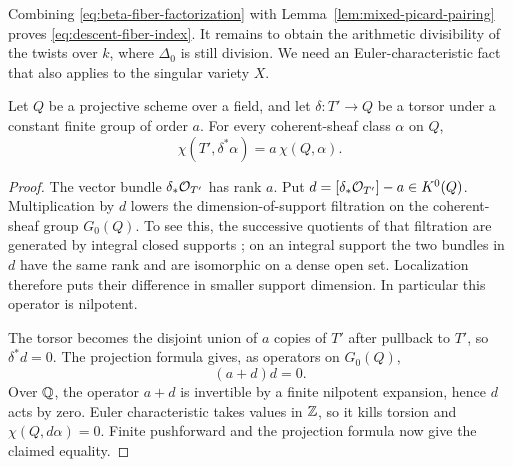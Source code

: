 Combining \eqref{eq:beta-fiber-factorization} with
Lemma~\ref{lem:mixed-picard-pairing} proves
\eqref{eq:descent-fiber-index}.  It remains to obtain the arithmetic
divisibility of the twists over \(k\), where \(\Delta_0\) is still
division.  We need an Euler-characteristic fact that also applies
to the singular variety \(X\).

\begin{lemma}\label{lem:torsor-euler}
Let \(Q\) be a projective scheme over a field, and let
\(\delta:T'\to Q\) be a torsor under a constant finite group
of order \(a\).  For every coherent-sheaf class \(\alpha\) on \(Q\),
\[
\chi(T',\delta^*\alpha)=a\,\chi(Q,\alpha).
\]
\end{lemma}
\begin{proof}
The vector bundle \(\delta_*\mathcal O_{T'}\) has rank \(a\).
Put \(d=[\delta_*\mathcal O_{T'}]-a\in K^0(Q)\).
Multiplication by \(d\) lowers the dimension-of-support filtration
on the coherent-sheaf group \(G_0(Q)\).
To see this, the successive quotients of that filtration are
generated by integral closed supports
\cite[Lemma~42.23.2, Tag 02S9]{Stacks}; on an integral support the two bundles
in \(d\) have the same rank and are isomorphic on a dense open
set.  Localization therefore puts their difference in smaller
support dimension.  In particular this operator is nilpotent.

The torsor becomes the disjoint union of \(a\) copies of \(T'\)
after pullback to \(T'\), so \(\delta^*d=0\).
The projection formula gives, as operators on \(G_0(Q)\),
\[
(a+d)d=0.
\]
Over \(\mathbb Q\), the operator \(a+d\) is invertible by a finite
nilpotent expansion, hence \(d\) acts by zero.
Euler characteristic takes values in \(\mathbb Z\), so it kills torsion
and \(\chi(Q,d\alpha)=0\).
Finite pushforward and the projection formula now give the
claimed equality.
\end{proof}

